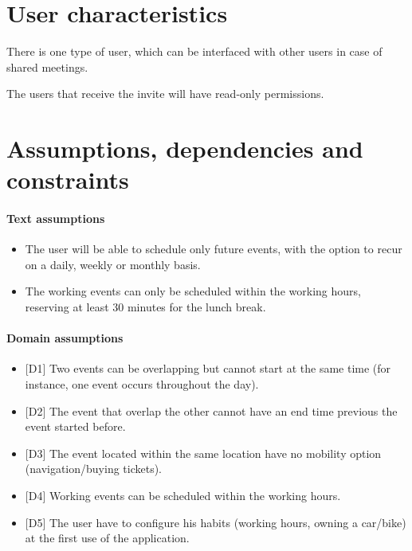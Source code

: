 \section{User characteristics}
\label{sec:usercharacteristics}
\begin{description}
\item There is one type of user, which can be interfaced with other users in case of shared meetings. 
\item The users that receive the invite will have read-only permissions.
\end{description}

\section{Assumptions, dependencies and constraints}
\label{sec:assumpdepenconst}

\paragraph{Text assumptions}
\begin{itemize}
\item The user will be able to schedule only future events, with the option to recur on a daily, weekly or monthly basis.
\item The working events can only be scheduled within the working hours, reserving at least 30 minutes for the lunch break.
\end{itemize}

\paragraph{Domain assumptions}
\begin{itemize}
\item {[D1]} Two events can be overlapping but cannot start at the same time (for instance, one event occurs throughout the day).
\item {[D2]} The event that overlap the other cannot have an end time previous the event started before.
\item {[D3]} The event located within the same location have no mobility option (navigation/buying tickets).
\item {[D4]} Working events can be scheduled within the working hours.
\item {[D5]} The user have to configure his habits (working hours, owning a car/bike) at the first use of the application.
\end{itemize}

